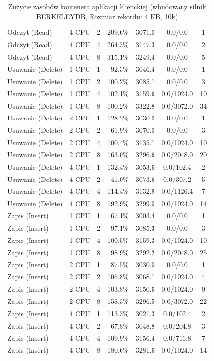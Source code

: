 \begin{table}[ht]
{\begin{tabular}{llcrrcc}
Odczyt (Read) & 4 CPU & 2 & 209.6\% & 3071.0 & 0.0/0.0 & 1 \\
Odczyt (Read) & 4 CPU & 4 & 264.3\% & 3147.3 & 0.0/0.0 & 2 \\
Odczyt (Read) & 4 CPU & 8 & 315.1\% & 3249.4 & 0.0/0.0 & 5 \\
Usuwanie (Delete) & 1 CPU & 1 & 92.3\% & 3046.4 & 0.0/0.0 & 1 \\
Usuwanie (Delete) & 1 CPU & 2 & 100.2\% & 3085.7 & 0.0/0.0 & 3 \\
Usuwanie (Delete) & 1 CPU & 4 & 102.1\% & 3159.6 & 0.0/1024.0 & 10 \\
Usuwanie (Delete) & 1 CPU & 8 & 100.2\% & 3322.8 & 0.0/3072.0 & 34 \\
Usuwanie (Delete) & 2 CPU & 1 & 128.2\% & 3030.0 & 0.0/0.0 & 1 \\
Usuwanie (Delete) & 2 CPU & 2 & 61.9\% & 3070.0 & 0.0/0.0 & 3 \\
Usuwanie (Delete) & 2 CPU & 4 & 100.4\% & 3135.7 & 0.0/1024.0 & 10 \\
Usuwanie (Delete) & 2 CPU & 8 & 163.0\% & 3296.6 & 0.0/2048.0 & 20 \\
Usuwanie (Delete) & 4 CPU & 1 & 132.4\% & 3053.6 & 0.0/102.4 & 2 \\
Usuwanie (Delete) & 4 CPU & 2 & 41.0\% & 3073.6 & 0.0/307.2 & 5 \\
Usuwanie (Delete) & 4 CPU & 4 & 114.4\% & 3132.9 & 0.0/1126.4 & 7 \\
Usuwanie (Delete) & 4 CPU & 8 & 192.9\% & 3299.0 & 0.0/1024.0 & 14 \\
Zapis (Insert) & 1 CPU & 1 & 67.1\% & 3003.4 & 0.0/0.0 & 1 \\
Zapis (Insert) & 1 CPU & 2 & 97.1\% & 3085.3 & 0.0/0.0 & 3 \\
Zapis (Insert) & 1 CPU & 4 & 100.5\% & 3159.3 & 0.0/1024.0 & 10 \\
Zapis (Insert) & 1 CPU & 8 & 98.9\% & 3292.2 & 0.0/2048.0 & 25 \\
Zapis (Insert) & 2 CPU & 1 & 87.5\% & 3030.0 & 0.0/0.0 & 1 \\
Zapis (Insert) & 2 CPU & 2 & 106.8\% & 3068.7 & 0.0/1024.0 & 4 \\
Zapis (Insert) & 2 CPU & 4 & 103.8\% & 3150.6 & 0.0/1024.0 & 9 \\
Zapis (Insert) & 2 CPU & 8 & 158.3\% & 3296.5 & 0.0/3072.0 & 22 \\
Zapis (Insert) & 4 CPU & 1 & 113.3\% & 3021.3 & 0.0/102.4 & 2 \\
Zapis (Insert) & 4 CPU & 2 & 67.8\% & 3048.8 & 0.0/204.8 & 3 \\
Zapis (Insert) & 4 CPU & 4 & 109.9\% & 3156.4 & 0.0/716.8 & 7 \\
Zapis (Insert) & 4 CPU & 8 & 180.6\% & 3281.6 & 0.0/1024.0 & 14 \\
\bottomrule
\end{tabular}%
}
\caption{Zużycie zasobów kontenera aplikacji klienckiej (wbudowany silnik BERKELEYDB, Rozmiar rekordu: 4 KB, 10k)}
\label{tab:resources_berkeleydb_medium_10000}
\end{table}
